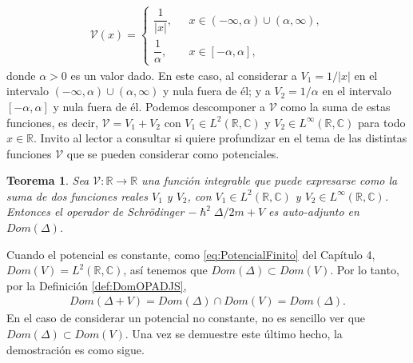\documentclass[12pt]{article}
\newtheorem{teo}{Teorema}[section]
\theoremstyle{definition}
\newcommand*{\field}[1]{\mathbb{#1}}
\begin{document}
    \begin{align*}
        \mathcal{V}(x) = 
        \left\{ \begin{array}{ll}
        \dfrac{1}{|x|},& \:\:\:  x \in (-\infty,\alpha)\cup (\alpha,\infty),
        \\
        \dfrac{1}{\alpha},& \:\:\: x \in [-\alpha,\alpha],
        \end{array}
        \right.
    \end{align*}
    donde $\alpha>0$ es un valor dado. En este caso, al considerar a $V_{1} = 1/|x|$ en el intervalo $(-\infty,\alpha)\cup (\alpha,\infty)$ y nula fuera de él; y a $V_{2} = 1/\alpha$ en el intervalo  $[-\alpha,\alpha]$ y nula fuera de él. Podemos descomponer a $\mathcal{V}$ como la suma de estas funciones, es decir,  $\mathcal{V} = V_{1}+V_{2}$ con $V_{1}\in L^2(\field{R},\field{C})$ y  $V_{2}\in L^{\infty}(\field{R},\field{C})$ para todo $x\in\field{R}$. Invito al lector a consultar \cite{ Oliveira,ReedIV} si quiere profundizar en el tema de las distintas funciones $\mathcal{V}$ que se pueden considerar como potenciales.
\begin{teo}
    Sea $\mathcal{V}:\field{R}\longrightarrow\field{R}$ una función integrable que puede expresarse como la suma de dos funciones reales $V_{1}$ y $V_{2}$, con $V_{1}\in L^{2}(\field{R},\field{C})$ y $V_{2}\in L^{\infty}(\field{R},\field{C})$. Entonces el operador de Schrödinger $-\hslash^2 \Delta/2m + V$ es auto-adjunto en $Dom(\Delta)$.
    \label{teo:SCOperator}
\end{teo}
\noindent
Cuando el potencial es constante, como \eqref{eq:PotencialFinito} del Capítulo 4, $Dom(V)=L^{2}(\field{R},\field{C})$, así tenemos que $Dom(\Delta) \subset Dom(V)$. Por lo tanto, por la Definición \ref{def:DomOPADJS},
    \begin{align*} Dom(\Delta + V) = Dom(\Delta)\cap Dom(V) = Dom(\Delta).
    \end{align*}
En el caso de considerar un potencial no constante, no es sencillo ver que $Dom(\Delta)\subset Dom(V)$. Una vez se demuestre este último hecho, la demostración es como sigue.
\end{document}
